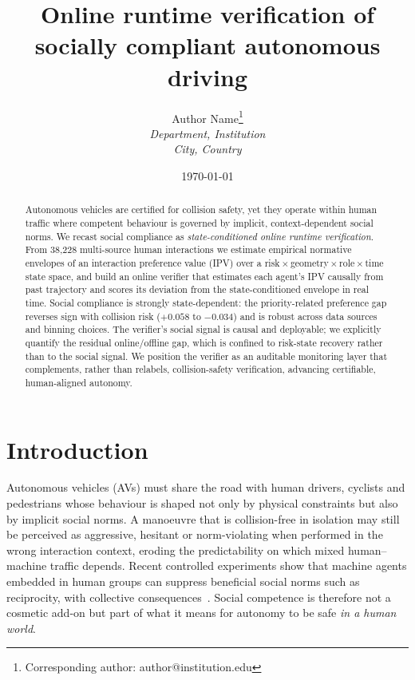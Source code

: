 \documentclass[12pt,a4paper]{article}
\title{Online runtime verification of socially compliant autonomous driving}
\author{
    Author Name\thanks{Corresponding author: author@institution.edu} \\
    \textit{Department, Institution} \\
    \textit{City, Country}
}
\date{\today}
\begin{document}
\maketitle

\begin{abstract}
\noindent
Autonomous vehicles are certified for collision safety, yet they operate within human
traffic where competent behaviour is governed by implicit, context-dependent social
norms. We recast social compliance as \emph{state-conditioned online runtime
verification}. From 38{,}228 multi-source human interactions we estimate empirical
normative envelopes of an interaction preference value (IPV) over a
risk\,$\times$\,geometry\,$\times$\,role\,$\times$\,time state space, and build an online
verifier that estimates each agent's IPV causally from past trajectory and scores its
deviation from the state-conditioned envelope in real time. Social compliance is strongly
state-dependent: the priority-related preference gap reverses sign with collision risk
($+0.058$ to $-0.034$) and is robust across data sources and binning choices. The
verifier's social signal is causal and deployable; we explicitly quantify the residual
online/offline gap, which is confined to risk-state recovery rather than to the social
signal. We position the verifier as an auditable monitoring layer that complements, rather
than relabels, collision-safety verification, advancing certifiable, human-aligned autonomy.
\end{abstract}

\section{Introduction}
Autonomous vehicles (AVs) must share the road with human drivers, cyclists and
pedestrians whose behaviour is shaped not only by physical constraints but also by
implicit social norms. A manoeuvre that is collision-free in isolation may still be
perceived as aggressive, hesitant or norm-violating when performed in the wrong
interaction context, eroding the predictability on which mixed human--machine traffic
depends. Recent controlled experiments show that machine agents embedded in human groups
can suppress beneficial social norms such as reciprocity, with collective
consequences~\cite{shirado2023reciprocity}. Social competence is therefore not a cosmetic
add-on but part of what it means for autonomy to be safe \emph{in a human world}.
\end{document}

